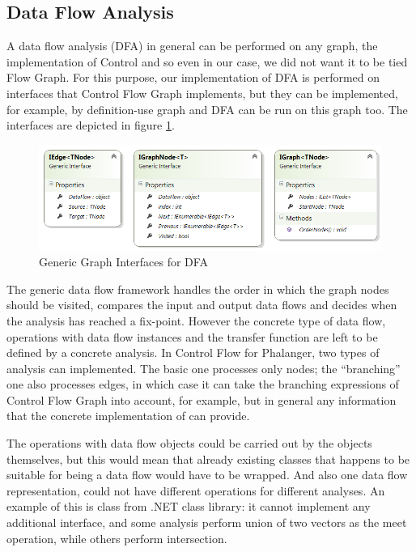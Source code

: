     \subsection{Data Flow Analysis}
        A data flow analysis (DFA) in general can be performed on any graph, 
        the implementation of Control 
        and so even in our case, we did not want it to be tied 
        Flow Graph. For this purpose, our implementation of DFA is 
        performed on interfaces that Control Flow Graph implements, 
        but they can be implemented, for example, by definition-use 
        graph\cite{aho1985compilers} and DFA can be run on this graph too.
        The interfaces are depicted in figure \ref{graphifaces}.
        
\begin{figure}[h]  
  \centering
    \includegraphics*[width=\textwidth,height=\textheight,keepaspectratio]{img/graph-ifaces.png}  
    \caption{Generic Graph Interfaces for DFA\label{graphifaces}}
\end{figure}    

        The generic data flow framework handles the order in which the 
        graph nodes should be visited, compares the input and output 
        data flows and decides when the analysis has reached a fix-point. 
        However the concrete type of data flow, operations with data 
        flow instances and the transfer function are left to be defined 
        by a concrete analysis. In Control Flow for 
        Phalanger, two types of analysis can implemented. The basic one 
        processes only nodes; the ``branching'' one also processes edges, 
        in which case it can take the branching expressions of Control 
        Flow Graph into account, for example, but in general any information 
        that the concrete implementation of  can provide.
        
        The operations with data flow objects could be carried out by the 
        objects themselves, but this would mean that already existing 
        classes that happens to be suitable for being a data flow would 
        have to be wrapped. And also one data flow representation, could 
        not have different operations for different analyses. An example 
        of this is  class from .NET class library: it 
        cannot implement any additional interface, and some analysis 
        perform union of two vectors as the meet operation, while 
        others perform intersection.
        
